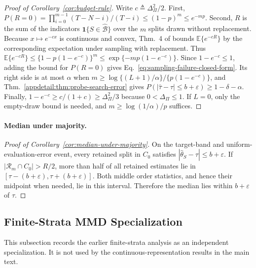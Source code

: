 \begin{proof}[Proof of Corollary~\ref{cor:budget-rule}]
Write $c\triangleq\Delta_\Pi^2/2$. First, $P(R=0)=\prod_{i=0}^{m-1}(T-N-i)/(T-i)\le(1-p)^m\le e^{-mp}$. Second, $R$ is the sum of the indicators $\mathbf 1\{S\in\widehat{\mathcal B}\}$ over the $m$ splits drawn without replacement. Because $x\mapsto e^{-cx}$ is continuous and convex, Thm.~4 of \citet{hoeffding1963probability} bounds $\mathbb E\{e^{-cR}\}$ by the corresponding expectation under sampling with replacement. Thus $\mathbb E\{e^{-cR}\}\le\{1-p(1-e^{-c})\}^m\le\exp\{-mp(1-e^{-c})\}$. Since $1-e^{-c}\le1$, adding the bound for $P(R=0)$ gives Eq.~\eqref{eq:sampling-failure-closed-form}. Its right side is at most $\alpha$ when $m\ge\log\{(L+1)/\alpha\}/\{p(1-e^{-c})\}$, and Thm.~\ref{appdetail:thm:probe-search-error} gives $P(|\widehat\tau-\tau|\le b+\varepsilon)\ge1-\delta-\alpha$. Finally, $1-e^{-c}\ge c/(1+c)\ge\Delta_\Pi^2/3$ because $0<\Delta_\Pi\le1$. If $L=0$, only the empty-draw bound is needed, and $m\ge\log(1/\alpha)/p$ suffices.
\end{proof}

\paragraph{Median under majority.}
\begin{proof}[Proof of Corollary~\ref{cor:median-under-majority}]
On the target-band and uniform-evaluation-error event, every retained split in $C_0$ satisfies $|\widehat\theta_S-\tau|\le b+\varepsilon$. If $|\mathcal R_m\cap C_0|>R/2$, more than half of all retained estimates lie in $[\tau-(b+\varepsilon),\tau+(b+\varepsilon)]$. Both middle order statistics, and hence their midpoint when needed, lie in this interval. Therefore the median lies within $b+\varepsilon$ of $\tau$.
\end{proof}

\subsection{Finite-Strata MMD Specialization}
\label{app:finite-strata-mmd-specialization}

This subsection records the earlier finite-strata analysis as an independent specialization. It is not used by the continuous-representation results in the main text.

